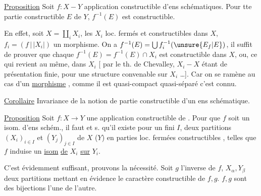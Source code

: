 \uline{Proposition} Soit $f:X-Y$  application constructible d'ens schématiques. Pour tte partie constructible $E$ de $Y$, $f^{-1}(E)$ est constructible.


En effet, soit $X=\coprod_iX_i$, les $X_i$ loc. fermés et constructibles dans $X$,  $f_i=(f\,|\,|X_i|)$ un morphisme. On a $f^{-1}(E)=\bigcup f_i^{-1}(\unsure{E_f|E})$, il suffit de prouver que chaque $f^{-1}(E)=f^{-1}(E)\cap X_i$ est constructible dans $X$, ou, ce qui revient au même, dans $X_i$ [ par le th. de Chevalley,  $X_i-X$ étant de présentation finie, pour une structure  convenable sur $X_i$ \ldots]. Car on se ramène au cas d'un \uline{morphisme} , comme il est quasi-compact quasi-séparé c'est connu.


\uline{Corollaire} Invariance de la notion de partie constructible d'un ens schématique.

\uline{Proposition} Soit $f:X\longrightarrow Y$ une application constructible de  . Pour que $f$ soit un isom. d'ens schém., il faut et s. qu'il existe  pour un fini $I$, deux partitions $(X_i)_{i\in I}$ et $(Y_j)_{j\in I}$ de $X$ ($Y$) en parties loc. fermées constructibles , telles que $f$ induise un \uline{isom} \uline{de} $X_i$ \uline{sur} $Y_i$.

C'est évidemment suffisant, prouvons la nécessité. Soit $g$ l'inverse de $f$, $X_\alpha,Y_\beta$ deux partitions  mettant en évidence le caractère constructible de $f,g$.  $f,g$ sont des bijections  l'une de l'autre.


